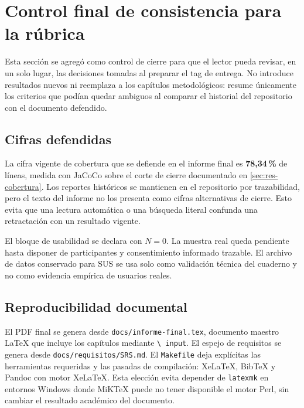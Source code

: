 \begin{landscape}
\begin{center}
\begin{longtable}{|p{1.2cm}|p{1.2cm}|p{1.35cm}|p{1.8cm}|p{1.5cm}|p{2.2cm}|p{2.3cm}|p{2.8cm}|p{1.8cm}|p{2.4cm}|p{1.8cm}|}
\hline
\end{longtable}
\end{center}
\end{landscape}

\clearpage
\section{Control final de consistencia para la rúbrica}
\label{sec:anexo-control-rubrica}

Esta sección se agregó como control de cierre para que el lector pueda
revisar, en un solo lugar, las decisiones tomadas al preparar el tag de
entrega. No introduce resultados nuevos ni reemplaza a los capítulos
metodológicos: resume únicamente los criterios que podían quedar
ambiguos al comparar el historial del repositorio con el documento
defendido.

\subsection*{Cifras defendidas}

La cifra vigente de cobertura que se defiende en el informe final es
\textbf{78,34\,\%} de líneas, medida con JaCoCo sobre el corte de cierre
documentado en \autoref{sec:res-cobertura}. Los reportes históricos se
mantienen en el repositorio por trazabilidad, pero el texto del informe
no los presenta como cifras alternativas de cierre. Esto evita que una
lectura automática o una búsqueda literal confunda una retractación con
un resultado vigente.

El bloque de usabilidad se declara con \textbf{$N=0$}. La muestra real
queda pendiente hasta disponer de participantes y consentimiento
informado trazable. El archivo de datos conservado para SUS se usa solo
como validación técnica del cuaderno y no como evidencia empírica de
usuarios reales.

\subsection*{Reproducibilidad documental}

El PDF final se genera desde \texttt{docs/informe-final.tex}, documento
maestro LaTeX que incluye los capítulos mediante \texttt{\textbackslash
input}. El espejo de requisitos se genera desde
\texttt{docs/requisitos/SRS.md}. El \texttt{Makefile} deja explícitas las
herramientas requeridas y las pasadas de compilación: XeLaTeX, BibTeX y
Pandoc con motor XeLaTeX. Esta elección evita depender de \texttt{latexmk}
en entornos Windows donde MiKTeX puede no tener disponible el motor Perl,
sin cambiar el resultado académico del documento.

